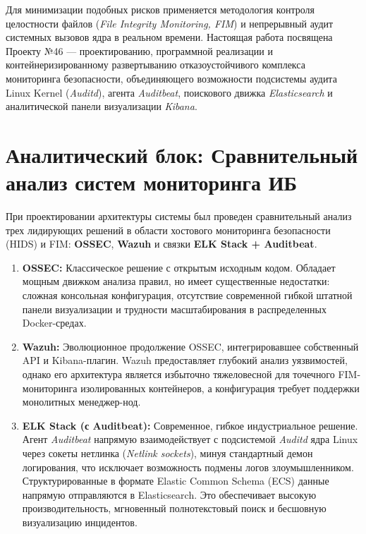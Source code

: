 \documentclass[a4paper,12pt]{article}
\begin{document}
Для минимизации подобных рисков применяется методология контроля целостности файлов (\textit{File Integrity Monitoring, FIM}) и непрерывный аудит системных вызовов ядра в реальном времени. Настоящая работа посвящена Проекту №46 — проектированию, программной реализации и контейнеризированному развертыванию отказоустойчивого комплекса мониторинга безопасности, объединяющего возможности подсистемы аудита Linux Kernel (\textit{Auditd}), агента \textit{Auditbeat}, поискового движка \textit{Elasticsearch} и аналитической панели визуализации \textit{Kibana}.

\section{Аналитический блок: Сравнительный анализ систем мониторинга ИБ}
При проектировании архитектуры системы был проведен сравнительный анализ трех лидирующих решений в области хостового мониторинга безопасности (HIDS) и FIM: \textbf{OSSEC}, \textbf{Wazuh} и связки \textbf{ELK Stack + Auditbeat}.

\begin{enumerate}
    \item \textbf{OSSEC:} Классическое решение с открытым исходным кодом. Обладает мощным движком анализа правил, но имеет существенные недостатки: сложная консольная конфигурация, отсутствие современной гибкой штатной панели визуализации и трудности масштабирования в распределенных Docker-средах.
    \item \textbf{Wazuh:} Эволюционное продолжение OSSEC, интегрировавшее собственный API и Kibana-плагин. Wazuh предоставляет глубокий анализ уязвимостей, однако его архитектура является избыточно тяжеловесной для точечного FIM-мониторинга изолированных контейнеров, а конфигурация требует поддержки монолитных менеджер-нод.
    \item \textbf{ELK Stack (с Auditbeat):} Современное, гибкое индустриальное решение. Агент \textit{Auditbeat} напрямую взаимодействует с подсистемой \textit{Auditd} ядра Linux через сокеты нетлинка (\textit{Netlink sockets}), минуя стандартный демон логирования, что исключает возможность подмены логов злоумышленником. Структурированные в формате Elastic Common Schema (ECS) данные напрямую отправляются в Elasticsearch. Это обеспечивает высокую производительность, мгновенный полнотекстовый поиск и бесшовную визуализацию инцидентов.
\end{enumerate}
\end{document}
